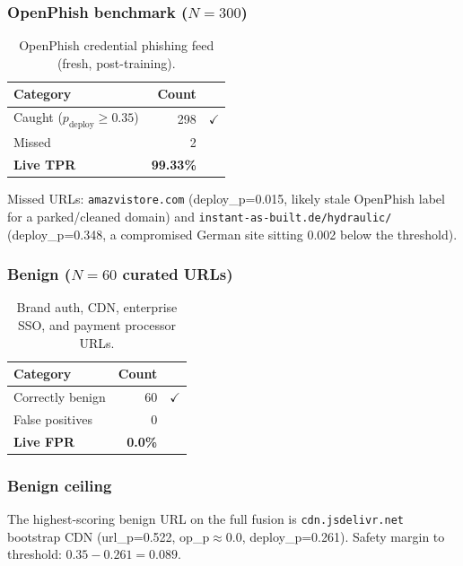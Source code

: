 \documentclass[11pt,a4paper]{article}
\newcommand{\code}[1]{\texttt{#1}}
\begin{document}
\subsubsection*{OpenPhish benchmark ($N = 300$)}

\begin{table}[h]
\centering
\begin{tabular}{lrl}
\toprule
Category & Count & \\
\midrule
Caught ($p_{\text{deploy}} \geq 0.35$) & 298 & $\checkmark$ \\
Missed & 2 & \\
\textbf{Live TPR} & \textbf{99.33\%} & \\
\bottomrule
\end{tabular}
\caption{OpenPhish credential phishing feed (fresh, post-training).}
\end{table}

Missed URLs: \code{amazvistore.com} (deploy\_p=0.015, likely stale
OpenPhish label for a parked/cleaned domain) and
\code{instant-as-built.de/hydraulic/} (deploy\_p=0.348, a compromised
German site sitting 0.002 below the threshold).

\subsubsection*{Benign ($N = 60$ curated URLs)}

\begin{table}[h]
\centering
\begin{tabular}{lrl}
\toprule
Category & Count & \\
\midrule
Correctly benign & 60 & $\checkmark$ \\
False positives & 0 & \\
\textbf{Live FPR} & \textbf{0.0\%} & \\
\bottomrule
\end{tabular}
\caption{Brand auth, CDN, enterprise SSO, and payment processor URLs.}
\end{table}

\subsubsection*{Benign ceiling}

The highest-scoring benign URL on the full fusion is
\code{cdn.jsdelivr.net} bootstrap CDN (url\_p=0.522,
op\_p$\approx$0.0, deploy\_p=0.261). Safety margin to threshold:
$0.35 - 0.261 = 0.089$.

\end{document}
